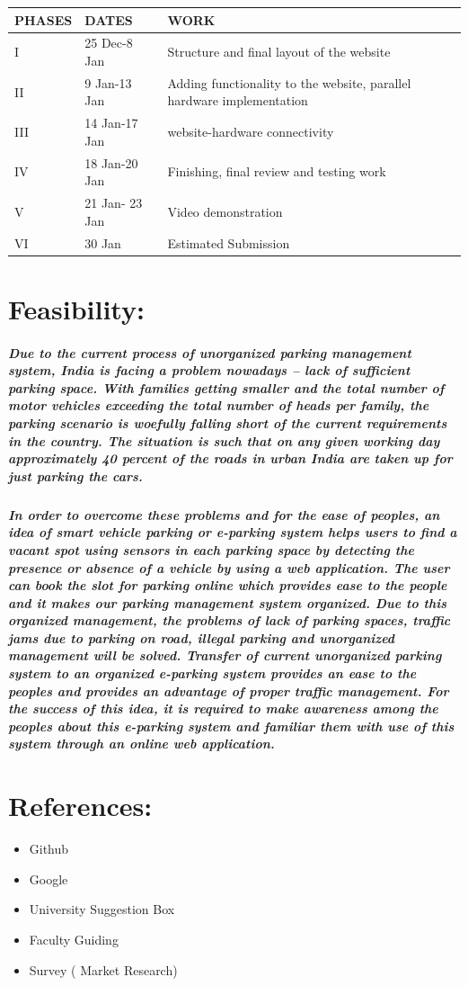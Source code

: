 \documentclass[]{article}
\begin{document}
    \begin{center}
    \begin{tabular}{|l|l|l|}
\hline
 PHASES & DATES & WORK \\
\hline
I & 25 Dec-8 Jan & Structure and final layout of the website \\
\hline
II & 9 Jan-13 Jan & Adding functionality to the website, parallel hardware implementation \\ 
\hline
III & 14 Jan-17 Jan & website-hardware connectivity \\
\hline
IV & 18 Jan-20 Jan & Finishing, final review and testing work \\
\hline
V & 21 Jan- 23 Jan & Video demonstration \\
\hline
VI & 30 Jan & Estimated Submission \\
\hline
    \end{tabular}
    \end{center}
    
\section{Feasibility:}
\subparagraph{Due to the current process of unorganized parking management system, India is facing a problem nowadays – lack of sufficient parking space. With families getting smaller and the total number of motor vehicles exceeding the total number of heads per family, the parking scenario is woefully falling short of the current requirements in the country. The situation is such that on any given working day approximately 40 percent of the roads in urban India are taken up for just parking the cars.}
\subparagraph{In order to overcome these problems and for the ease of peoples, an idea of smart vehicle parking or e-parking system helps users to find a vacant spot using sensors in each parking space by detecting the presence or absence of a vehicle by using a web application. The user can book the slot for parking online which provides ease to the people and it makes our parking management system organized. Due to this organized management, the problems of lack of parking spaces, traffic jams due to parking on road, illegal parking and unorganized management will be solved. Transfer of current unorganized parking system to an organized e-parking system provides an ease to the peoples and provides an advantage of proper traffic management. For the success of this idea, it is required to make awareness among the peoples about this e-parking system and familiar them with use of this system through an online web application.}

\section{References:}
\begin{itemize}
	\item Github
	\item Google
	\item University Suggestion Box
	\item Faculty Guiding
	\item Survey ( Market Research)
\end{itemize}
\end{document}
